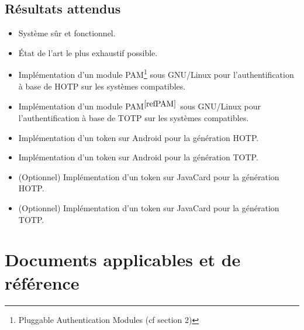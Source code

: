 \documentclass{"../../res/univ-projet"}
\begin{document}
    \subsection{Résultats attendus} 
        \begin{itemize}
            \item Système sûr et fonctionnel.
            \item État de l'art le plus exhaustif possible.
            \item Implémentation d'un module PAM{\footnote{Pluggable Authentication Modules (cf section 2)\label{refPAM}}}
            sous GNU/Linux pour l'authentification à base de HOTP sur les systèmes compatibles.
            \item Implémentation d'un module PAM$^{\ref{refPAM}}$ sous GNU/Linux pour l'authentification à base de TOTP sur les systèmes compatibles.
            \item Implémentation d'un token sur Android pour la génération HOTP.
            \item Implémentation d'un token sur Android pour la génération TOTP.
            \item (Optionnel) Implémentation d'un token sur JavaCard pour la génération HOTP.
            \item (Optionnel) Implémentation d'un token sur JavaCard pour la génération TOTP.
        \end{itemize}
        
\newpage
\section{Documents applicables et de référence}
\end{document}
